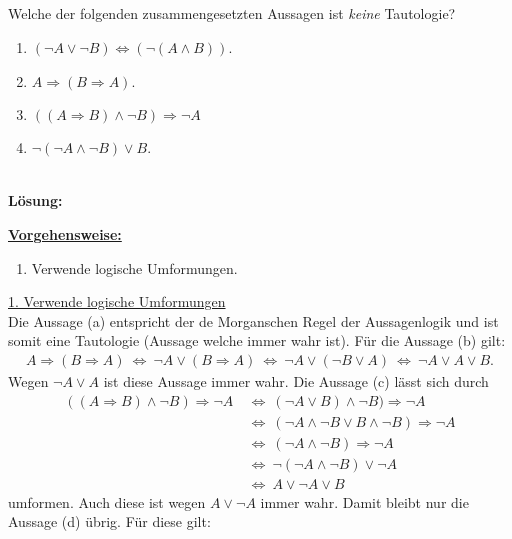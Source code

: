 \subsection*{}
Welche der folgenden zusammengesetzten Aussagen ist \textit{keine} Tautologie? 
\renewcommand{\labelenumi}{(\alph{enumi})}
\begin{enumerate}
	\item $( \neg A \vee \neg B ) \Leftrightarrow (\neg  (A \wedge B))$.
	\item $ A \Rightarrow ( B \Rightarrow A)$.
	\item $ ((A \Rightarrow B) \wedge \neg  B) \Rightarrow \neg A$
	\item $ \neg ( \neg A \wedge \neg  B ) \vee B$.
\end{enumerate}
\ \\
\textbf{Lösung:}
\begin{mdframed}
	\underline{\textbf{Vorgehensweise:}}
	\renewcommand{\labelenumi}{\theenumi.}
	\begin{enumerate}
		\item Verwende logische Umformungen.
	\end{enumerate}
\end{mdframed}
\underline{1. Verwende logische Umformungen}\\
Die Aussage (a) entspricht der de Morganschen Regel der Aussagenlogik und ist somit eine Tautologie (Aussage welche immer wahr ist). Für die Aussage (b) gilt:
\begin{align*}
	A \Rightarrow (B \Rightarrow A)
	\ \Leftrightarrow \
	\neg A \vee (B \Rightarrow A)
	\ \Leftrightarrow \
	\neg A \vee ( \neg B \vee A)
	\ \Leftrightarrow \ 
	\neg A \vee A \vee B.
\end{align*}
Wegen $\neg A \vee A $ ist diese Aussage immer wahr. Die Aussage (c) lässt sich durch
\begin{align*}
	((A \Rightarrow B ) \wedge \neg B) \Rightarrow \neg A
	&\ \Leftrightarrow \
	(\neg A \vee B ) \wedge \neg B ) \Rightarrow \neg A\\
	&\ \Leftrightarrow \
	(\neg A \wedge \neg B \vee B \wedge \neg B) \Rightarrow \neg A\\
	&\ \Leftrightarrow \
	(\neg A \wedge \neg B ) \Rightarrow \neg A\\
	&\ \Leftrightarrow \
	 \neg (\neg A \wedge \neg B ) \vee \neg A\\
	&\ \Leftrightarrow  \
	A \vee \neg A \vee B
\end{align*}
umformen. Auch diese ist wegen $A \vee \neg A$ immer wahr. Damit bleibt nur die Aussage (d) übrig. Für diese gilt:
